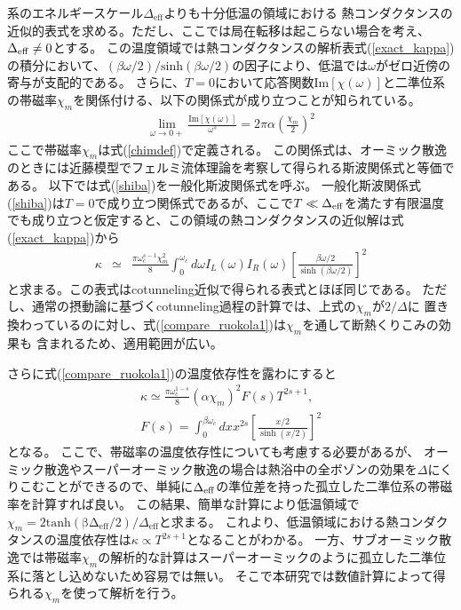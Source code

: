 系のエネルギースケール$\Delta_{\mathrm{eff}}$よりも十分低温の領域における
熱コンダクタンスの近似的表式を求める。ただし、ここでは局在転移は起こらない場合を考え、$\Delta_{\rm eff}\neq0$とする。
この温度領域では熱コンダクタンスの解析表式(\ref{exact_kappa})の積分において、$(\beta\omega/2)/\mathrm{sinh}(\beta\omega/2)$の因子により、低温では$\omega$がゼロ近傍の寄与が支配的である。
さらに、$T=0$において応答関数$\mathrm{Im}[\chi(\omega)]$と二準位系の帯磁率$\chi_m$を関係付ける、以下の関係式が成り立つことが知られている\cite{Sassetti90}。
\begin{eqnarray}
	 \lim_{\omega \to 0+} \frac{\mathrm{Im}[\chi(\omega)]}{\omega^{s}}=2\pi\alpha\left(\frac{\chi_m}{2}\right)^{2}
	 \label{shiba}
\end{eqnarray}
ここで帯磁率$\chi_m$は式(\ref{chimdef})で定義される。
この関係式は、オーミック散逸のときには近藤模型でフェルミ流体理論を考察して得られる斯波関係式\cite{Shiba75,Tsvelick83,Okiji87}と等価である。
以下では式(\ref{shiba})を一般化斯波関係式を呼ぶ。
一般化斯波関係式(\ref{shiba})は$T=0$で成り立つ関係式であるが、ここで$T\ll\Delta_{\rm{eff}}$を満たす有限温度でも成り立つと仮定すると、この領域の熱コンダクタンスの近似解は式(\ref{exact_kappa})から
\begin{eqnarray}
	\kappa&\simeq& \frac{\pi\omega_c^{s-1}\chi_m^2}{8}\int_{0}^{\omega_{c}}d\omega  I_L(\omega)I_R (\omega)\left[\frac{\beta\omega/2}{\sinh{(\beta\omega/2)}}\right]^{2}
	\label{compare_ruokola1}
\end{eqnarray}
と求まる。この表式はcotunneling近似で得られる表式とほぼ同じである\cite{Ruokola11}。
ただし、通常の摂動論に基づくcotunneling過程の計算では、上式の$\chi_m$が$2/\Delta$に
置き換わっているのに対し、式(\ref{compare_ruokola1})は$\chi_m$を通して断熱くりこみの効果も
含まれるため、適用範囲が広い。

さらに式(\ref{compare_ruokola1})の温度依存性を露わにすると
\begin{eqnarray}
	\kappa\simeq \frac{\pi\omega_c^{1-s}}{8}\left( \alpha \chi_m \right)^2 F(s)T^{2s+1}
	\label{cond_lowtemp},\\
	F (s)=\int_{0}^{\beta\omega_{c}}dx  x^{2s}\left[\frac{x/2}{\sinh({x/2})}\right]^{2}
\end{eqnarray}
となる。
ここで、帯磁率の温度依存性についても考慮する必要があるが、
オーミック散逸やスーパーオーミック散逸の場合は熱浴中の全ボゾンの効果を$\Delta$にくりこむことができるので、単純に$\Delta_{\rm eff}$の準位差を持った孤立した二準位系の帯磁率を計算すれば良い。
この結果、簡単な計算により低温領域で$\chi_m=2\mathrm{tanh(\beta\Delta_{\mathrm{eff}}/2)}/\Delta_{\mathrm{eff}}$と求まる。
これより、低温領域における熱コンダクタンスの温度依存性は$\kappa\propto T^{2s+1}$となることがわかる。
一方、サブオーミック散逸では帯磁率$\chi_m$の解析的な計算はスーパーオーミックのように孤立した二準位系に落とし込めないため容易では無い。
そこで本研究では数値計算によって得られる$\chi_m$を使って解析を行う。


